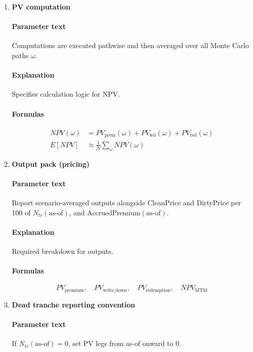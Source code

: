 \documentclass[11pt]{article}
\begin{document}
\begin{enumerate}[label=\arabic*),leftmargin=*,align=left]
\paragraph{Explanation} Specifies how cashflows are discounted to as-of.

\item \textbf{PV computation}
\paragraph{Parameter text} Computations are executed pathwise and then averaged over all Monte Carlo paths $\omega$.
\paragraph{Explanation} Specifies calculation logic for NPV.
\paragraph{Formulas}
\begin{align*}
NPV(\omega) &= PV_{\text{prem}}(\omega) + PV_{\text{wd}}(\omega) + PV_{\text{red}}(\omega) \\
E[NPV] &\approx \frac{1}{N} \sum_{\omega} NPV(\omega)
\end{align*}

\item \textbf{Output pack (pricing)}
\paragraph{Parameter text} Report scenario-averaged outputs alongside CleanPrice and DirtyPrice per 100 of $N_{tr}(\text{as-of})$, and $\text{AccruedPremium}(\text{as-of})$.
\paragraph{Explanation} Required breakdown for outputs.
\paragraph{Formulas} 
\[ PV_{\text{premium}}, \quad PV_{\text{write\_down}}, \quad PV_{\text{redemption}}, \quad NPV_{\text{MTM}} \]

\item \textbf{Dead tranche reporting convention}
\paragraph{Parameter text} If $N_{tr}(\text{as-of}) = 0$, set PV legs from as-of onward to 0.

\end{enumerate}
\end{document}
